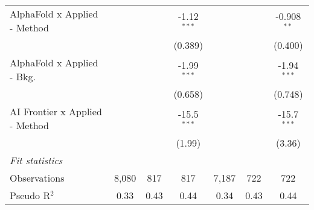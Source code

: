 \begin{tabular}{lcccccc}
   AlphaFold x Applied - Method   &               &               & -1.12$^{***}$ &               &               & -0.908$^{**}$\\   
                                  &               &               & (0.389)       &               &               & (0.400)\\   
   AlphaFold x Applied - Bkg.     &               &               & -1.99$^{***}$ &               &               & -1.94$^{***}$\\   
                                  &               &               & (0.658)       &               &               & (0.748)\\   
   AI Frontier x Applied - Method &               &               & -15.5$^{***}$ &               &               & -15.7$^{***}$\\   
                                  &               &               & (1.99)        &               &               & (3.36)\\   
   \midrule
   \emph{Fit statistics}\\
   Observations                   & 8,080         & 817           & 817           & 7,187         & 722           & 722\\  
   Pseudo R$^2$                   & 0.33          & 0.43          & 0.44          & 0.34          & 0.43          & 0.44\\  
   

\end{tabular}
